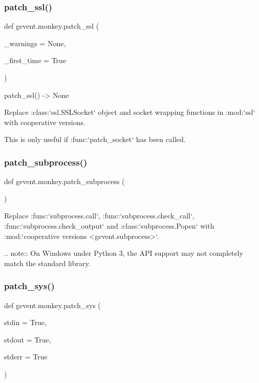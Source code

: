 \subsubsection{\texorpdfstring{patch\+\_\+ssl()}{patch\_ssl()}}
{\footnotesize\ttfamily def gevent.\+monkey.\+patch\+\_\+ssl (\begin{DoxyParamCaption}\item[{}]{\+\_\+warnings = {\ttfamily None},  }\item[{}]{\+\_\+first\+\_\+time = {\ttfamily True} }\end{DoxyParamCaption})}

\begin{DoxyVerb}patch_ssl() -> None

Replace :class:`ssl.SSLSocket` object and socket wrapping functions in
:mod:`ssl` with cooperative versions.

This is only useful if :func:`patch_socket` has been called.
\end{DoxyVerb}
 \mbox{\label{namespacegevent_1_1monkey_a50e99d9b8101122d6168b660eb83d77e}} 
\subsubsection{\texorpdfstring{patch\+\_\+subprocess()}{patch\_subprocess()}}
{\footnotesize\ttfamily def gevent.\+monkey.\+patch\+\_\+subprocess (\begin{DoxyParamCaption}{ }\end{DoxyParamCaption})}

\begin{DoxyVerb}Replace :func:`subprocess.call`, :func:`subprocess.check_call`,
:func:`subprocess.check_output` and :class:`subprocess.Popen` with
:mod:`cooperative versions <gevent.subprocess>`.

.. note::
   On Windows under Python 3, the API support may not completely match
   the standard library.\end{DoxyVerb}
 \mbox{\label{namespacegevent_1_1monkey_aeb8b7b80a2732e697d59550acfdca3d7}} 
\subsubsection{\texorpdfstring{patch\+\_\+sys()}{patch\_sys()}}
{\footnotesize\ttfamily def gevent.\+monkey.\+patch\+\_\+sys (\begin{DoxyParamCaption}\item[{}]{stdin = {\ttfamily True},  }\item[{}]{stdout = {\ttfamily True},  }\item[{}]{stderr = {\ttfamily True} }\end{DoxyParamCaption})}

